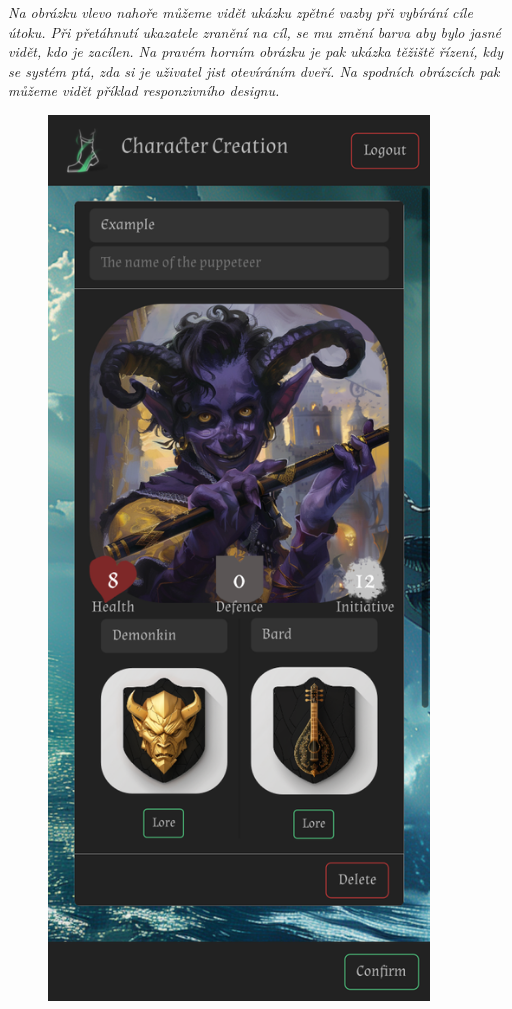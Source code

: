 \textit{Na obrázku vlevo nahoře můžeme vidět ukázku zpětné vazby při vybírání cíle útoku. Při přetáhnutí ukazatele zranění na cíl, se mu změní barva aby bylo jasné vidět, kdo je zacílen. Na pravém horním obrázku je pak ukázka těžiště řízení, kdy se systém ptá, zda si je uživatel jist otevíráním dveří. Na spodních obrázcích pak můžeme vidět příklad responzivního designu.}

\begin{figure}[H]
  \begin{minipage}{0.3\textwidth}
    \centering
    \includegraphics[width=0.9\textwidth]{resources/figures/example5.png}

\end{minipage}
\end{figure}
